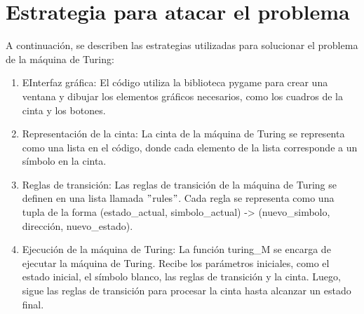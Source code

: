 \section{Estrategia para atacar el problema}
 A continuación, se describen las estrategias utilizadas para solucionar el problema de la máquina de Turing:\newline
\begin{enumerate}
    \item EInterfaz gráfica: El código utiliza la biblioteca pygame para crear una ventana y dibujar los elementos gráficos necesarios, como los cuadros de la cinta y los botones.\newline

    \item Representación de la cinta: La cinta de la máquina de Turing se representa como una lista en el código, donde cada elemento de la lista corresponde a un símbolo en la cinta.\newline
    
    \item Reglas de transición: Las reglas de transición de la máquina de Turing se definen en una lista llamada $"$rules$"$. Cada regla se representa como una tupla de la forma (estado\_actual, simbolo\_actual) -> (nuevo\_simbolo, dirección, nuevo\_estado).\newline
    
    \item Ejecución de la máquina de Turing: La función turing\_M se encarga de ejecutar la máquina de Turing. Recibe los parámetros iniciales, como el estado inicial, el símbolo blanco, las reglas de transición y la cinta. Luego, sigue las reglas de transición para procesar la cinta hasta alcanzar un estado final.\newline
\end{enumerate}


